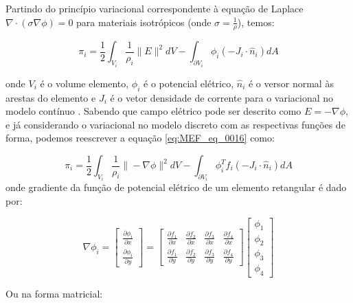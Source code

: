 \documentclass[
12pt,
a4paper,
oneside,
chapter=TITLE,
sumario=tradicional
]{abntex2}
\begin{document}
Partindo do princípio variacional correspondente à equação de Laplace $\nabla \cdot ( \sigma \nabla \phi) = 0$ para materiais isotrópicos (onde $\sigma = \frac{1}{\rho}$), temos:
	
	

\begin{equation}
	\pi_i =
	\frac{1}{2}\int_{V_i} \frac{1}{\rho_i}\|E\|^2 dV
	-
	\int_{\partial V_i} \phi_i (-J_i \cdot \hat{n}_i) dA
	\label{eq:MEF_eq_0016}
\end{equation}

onde $V_i$ é o volume elemento, $\phi_i$ é o potencial elétrico, $\hat{n}_i$ é o versor normal às arestas do elemento e $J_i$ é o vetor densidade de corrente para o variacional no modelo contínuo \cite{moura2013estimaccao}. Sabendo que campo elétrico pode ser descrito como $E = - \nabla \phi$, e já considerando o variacional no modelo discreto com as respectivas funções de forma, podemos reescrever a equação \ref{eq:MEF_eq_0016} como:


\begin{equation}
	\pi_i =
	\frac{1}{2}\int_{V_i} \frac{1}{\rho_i}\|-\nabla \phi\|^2 dV
	-
	\int_{\partial V_i} \phi_i^T f_i (-J_i \cdot \hat{n}_i) dA
	\label{eq:MEF_eq_0017}
\end{equation}
onde gradiente da função de potencial elétrico de um elemento retangular é dado por:

\begin{equation}
	\nabla \phi_i =
	\begin{bmatrix}
		\frac{\partial \phi_i}{\partial x} \\
		\frac{\partial \phi_i}{\partial y}
	\end{bmatrix}
	=
	\begin{bmatrix}
		\frac{\partial f_1}{\partial x} & \frac{\partial f_2}{\partial x} & \frac{\partial f_3}{\partial x} & \frac{\partial f_4}{\partial x}\\
		\frac{\partial f_1}{\partial y} & \frac{\partial f_2}{\partial y} & \frac{\partial f_3}{\partial y} & \frac{\partial f_4}{\partial y}
	\end{bmatrix}
	\begin{bmatrix}
		\phi_1 \\
		\phi_2 \\
		\phi_3 \\
		\phi_4
	\end{bmatrix}
	\label{eq:MEF_eq_0018}
\end{equation}

Ou na forma matricial:
\end{document}
